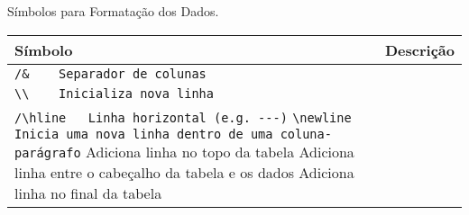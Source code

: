 \begin{quadro}[H]
    \centering
    \caption{Símbolos para Formatação dos Dados.\label{qua:quadro-dados}}
    \begin{tabular}{|p{4cm}|p{10cm}|}
        \hline
        \textbf{Símbolo} & \textbf{Descrição} \\
        \hline
        \verb|/&	Separador de colunas| \\
        \hline
        \verb|\\	Inicializa nova linha| \\
        \hline
        \verb|/\hline	Linha horizontal (e.g. ---)|
        \verb|\newline	Inicia uma nova linha dentro de uma coluna-parágrafo|
        \toprule	Adiciona linha no topo da tabela
        \midrule	Adiciona linha entre o cabeçalho da tabela e os dados
        \bottomrule	Adiciona linha no final da tabela\\
        \hline
    \end{tabular}
\end{quadro}